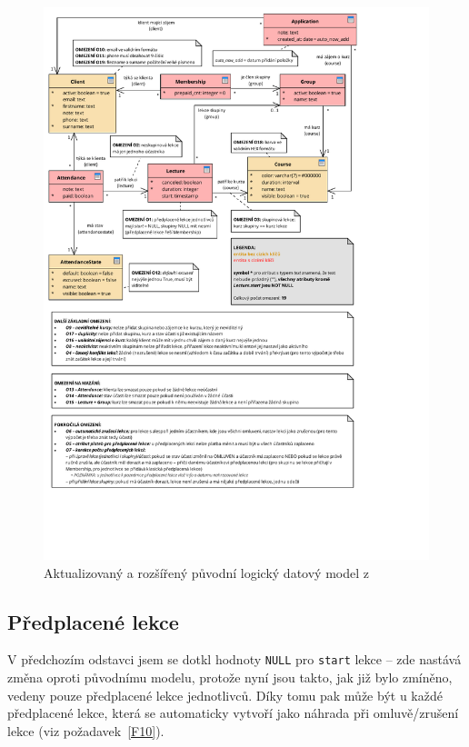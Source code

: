 \begin{figure}\centering
	\includegraphics[width=1\textwidth]{img/db-model}
	\caption[Aktualizovaný a rozšířený původní logický datový model]{Aktualizovaný a rozšířený původní logický datový model z~\cite{bp}}\label{fig:db-model}
\vspace{-28pt}
\end{figure}

\subsection{Předplacené lekce}

V předchozím odstavci jsem se dotkl hodnoty \verb|NULL| pro \verb|start| lekce -- zde nastává změna oproti původnímu modelu, protože nyní jsou takto, jak již bylo zmíněno, vedeny pouze předplacené lekce jednotlivců. Díky tomu pak může být u každé předplacené lekce, která se automaticky vytvoří jako náhrada při omluvě/zrušení lekce (viz požadavek~\ref{F10}).

